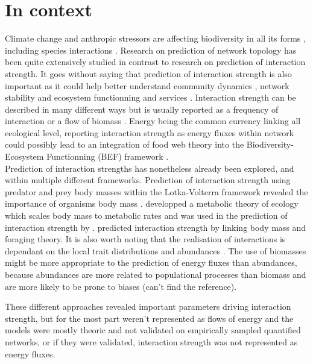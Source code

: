 \documentclass[12pt]{article}
\begin{document}



\section{In context}
Climate change and anthropic stressors are affecting biodiversity in all its forms \cite{Diaz-01SumPol}, including species interactions \cite{Estes2011TroDow, Purves2013TimMod, Woodward2010CliCha}. Research on prediction of network topology has been quite extensively studied in contrast to research on prediction of interaction strength. It goes without saying that prediction of interaction strength is also important as it could help better understand community dynamics \cite{Paine1992FooAna}, network stability \cite{Neutel2002StaRea, deRuiter1995EnePat} and ecosystem functionning and services \cite{Duffy2002Bioeco, Montoya2003FooWeb}. Interaction strength can be described in many different ways \cite{Berlow2004} but is usually reported as a frequency of interaction or a flow of biomass \cite{Heleno2014EcoNet}. Energy being the common currency linking all ecological level, reporting interaction strength as energy fluxes within network could possibly lead to an integration of food web theory into the Biodiversity-Ecosystem Functionning (BEF) framework \cite{Barnes2018EneFlu}.\\ 

Prediction of interaction strengths has nonetheless already been explored, and within multiple different frameworks. Prediction of interaction strength using predator and prey body masses within the Lotka-Volterra framework revealed the importance of organisms body mass \cite{Yodzis1992BodSiz, Pawar2015RolBod,Emmerson2004PrePre}. \citet{Brown2004MetThe} developped a metabolic theory of ecology which scales body mass to metabolic rates and was used in the prediction of interaction strength by \citep{Berlow2009SimPre}. \citet{Brose2010BodCon} predicted interaction strength by linking body mass and foraging theory. It is also worth noting that the realisation of interactions is dependant on the local trait distributions and abundances \cite{Poisot2015SpeWhy}. The use of biomasses might be more appropriate to the prediction of energy fluxes than abundances, because abundances are more related to populational processes than biomass and are more likely to be prone to biases (can't find the reference).

These different approaches revealed important parameters driving interaction strength, but for the most part weren't represented as flows of energy and the models were mostly theoric and not validated on empirically sampled quantified networks, or if they were validated, interaction strength was not represented as energy fluxes.
\end{document}
